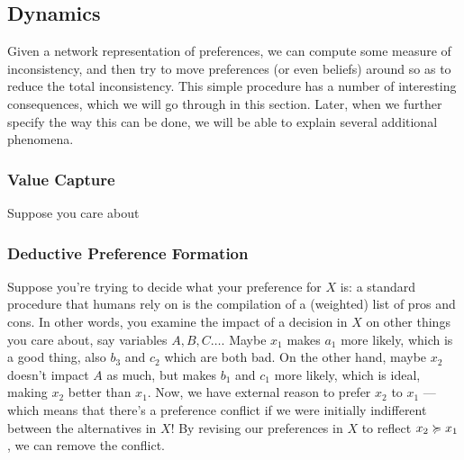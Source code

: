 \documentclass{article}
\begin{document}
	

	
	\subsection{Dynamics}
	
	Given a network representation of preferences, we can compute some measure of inconsistency, and then try to move preferences (or even beliefs) around so as to reduce the total inconsistency. This simple procedure has a number of interesting consequences, which we will go through in this section. 
	Later, when we further specify the way this can be done, we will be able to explain several additional phenomena.
	
	\subsubsection{Value Capture}
	Suppose you care about
	
	\subsubsection{Deductive Preference Formation}
	Suppose you're trying to decide what your preference for $X$ is: a standard procedure that humans rely on is the compilation of a (weighted) list of pros and cons. In other words, you examine the impact of a decision in $X$ on other things you care about, say variables $A, B, C\ldots$. Maybe $x_1$ makes $a_1$ more likely, which is a good thing, also $b_3$ and $c_2$ which are both bad. On the other hand, maybe $x_2$ doesn't impact $A$ as much, but makes $b_1$ and $c_1$ more likely, which is ideal, making $x_2$ better than $x_1$. Now, we have external reason to prefer $x_2$ to $x_1$ --- which means that there's a preference conflict if we were initially indifferent between the alternatives in $X$! By revising our preferences in $X$ to reflect $x_2 \succcurlyeq x_1$, we can remove the conflict. 
\end{document}
